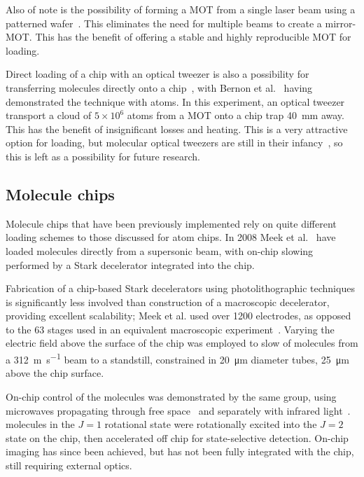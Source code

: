 Also of note is the possibility of forming a MOT from a single laser beam using
a patterned wafer~\cite{Nshii2013}. This eliminates the need for multiple beams
to create a mirror-MOT. This has the benefit of offering a stable and highly
reproducible MOT for loading.

Direct loading of a chip with an optical tweezer is also a possibility for
transferring molecules directly onto a chip~\cite{Liueaar7797}, with Bernon et
al.~\cite{Bernon2013} having demonstrated the technique with atoms. In this
experiment, an optical tweezer transport a cloud of $5\times10^6$ 
atoms from a MOT onto a chip trap \SI{40}{\milli\metre} away. This has the
benefit of insignificant losses and heating. This is a very attractive option
for loading, but molecular optical tweezers are still in their
infancy~\cite{Anderegg2019}, so this is left as a possibility for future
research.

\subsection{Molecule chips}
\label{litrev:molculechips}


Molecule chips that have been previously implemented rely on quite different
loading schemes to those discussed for atom chips. In 2008 Meek et
al.~\cite{Meek2008} have loaded  molecules directly from a supersonic
beam, with on-chip slowing performed by a Stark decelerator integrated into the
chip.

Fabrication of a chip-based Stark decelerators using photolithographic
techniques is significantly less involved than construction of a macroscopic
decelerator, providing excellent scalability; Meek et al. used over 1200
electrodes, as opposed to the 63 stages used in an equivalent macroscopic
experiment~\cite{Bethlem1999}. Varying the electric field above the surface of
the chip was employed to slow of molecules from a \SI{312}{\metre\per\second}
beam to a standstill, constrained in \SI{20}{\micro\metre} diameter tubes,
\SI{25}{\micro\metre} above the chip surface.~\cite{Meek2009}

On-chip control of the molecules was demonstrated by the same group, using
microwaves propagating through free space~\cite{doi:10.1002/cphc.201001007} and
separately with infrared light~\cite{doi:10.1080/00268976.2012.683885}.  
molecules in the $J=1$ rotational state were rotationally excited into the $J=2$
state on the chip, then accelerated off chip for state-selective detection.
On-chip imaging has since been achieved, but has not been fully integrated with
the chip, still requiring external optics.~\cite{Marx2013}

